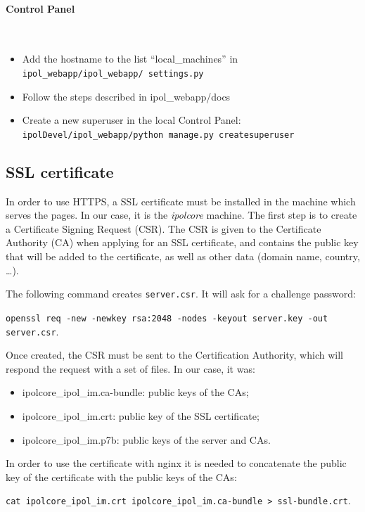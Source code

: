\paragraph{Control Panel} \hspace{0pt} \\
\begin{itemize}
    \item Add the hostname to the list ``local\_machines'' in  {\tt ipol\_webapp/ipol\_webapp/ settings.py}
    \item Follow the steps described in ipol\_webapp/docs
    \item Create a new superuser in the local Control Panel: {\tt ipolDevel/ipol\_webapp/python manage.py createsuperuser}
\end{itemize}

\subsection{SSL certificate}
In order to use HTTPS, a SSL certificate must be installed in the machine which serves the pages. In our case, it is the \emph{ipolcore} machine.
The first step is to create a Certificate Signing Request (CSR). The CSR is given to the Certificate Authority (CA) when applying for an SSL certificate, and contains the public key that will be added to the certificate, as well as other data (domain name, country, \dots).

The following command creates {\tt server.csr}. It will ask for a challenge password:

{\tt openssl req -new -newkey rsa:2048 -nodes -keyout server.key -out server.csr}.

Once created, the CSR must be sent to the Certification Authority, which will respond the request with a set of files. In our case, it was:
\begin{itemize}
    \item ipolcore\_ipol\_im.ca-bundle: public keys of the CAs;
    \item ipolcore\_ipol\_im.crt: public key of the SSL certificate;
    \item ipolcore\_ipol\_im.p7b: public keys of the server and CAs.
\end{itemize}

In order to use the certificate with nginx it is needed to concatenate the public key of the certificate with the public keys of the CAs:

{\tt cat ipolcore\_ipol\_im.crt ipolcore\_ipol\_im.ca-bundle > ssl-bundle.crt}.

